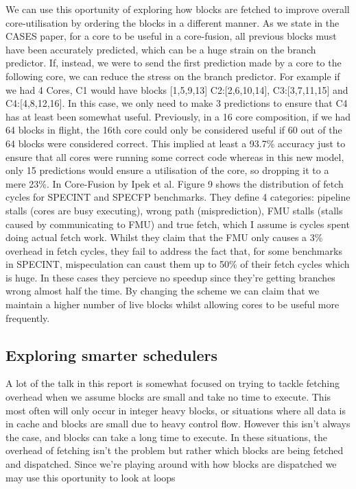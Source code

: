We can use this oportunity of exploring how blocks are fetched to improve overall core-utilisation by ordering the blocks in a different manner.
As we state in the CASES paper, for a core to be useful in a core-fusion, all previous blocks must have been accurately predicted, which can be a huge strain on the branch predictor.
If, instead, we were to send the first prediction made by a core to the following core, we can reduce the stress on the branch predictor.
For example if we had 4 Cores, C1 would have blocks [1,5,9,13] C2:[2,6,10,14], C3:[3,7,11,15] and C4:[4,8,12,16].
In this case, we only need to make 3 predictions to ensure that C4 has at least been somewhat useful.
Previously, in a 16 core composition, if we had 64 blocks in flight, the 16th core could only be considered useful if 60 out of the 64 blocks were considered correct.
This implied at least a 93.7\% accuracy just to ensure that all cores were running some correct code whereas in this new model, only 15 predictions would ensure a utilisation of the core, so dropping it to a mere 23\%.
In Core-Fusion by Ipek et al. Figure 9 shows the distribution of fetch cycles for SPECINT and SPECFP benchmarks.
They define 4 categories: pipeline stalls (cores are busy executing), wrong path (misprediction), FMU stalls (stalls caused by communicating to FMU) and true fetch, which I assume is cycles spent doing actual fetch work.
Whilst they claim that the FMU only causes a 3\% overhead in fetch cycles, they fail to address the fact that, for some benchmarks in SPECINT, mispeculation can caust them up to 50\% of their fetch cycles which is huge.
In these cases they percieve no speedup since they're getting branches wrong almost half the time.
By changing the scheme we can claim that we maintain a higher number of live blocks whilst allowing cores to be useful more frequently.

\subsection{Exploring smarter schedulers}

A lot of the talk in this report is somewhat focused on trying to tackle fetching overhead when we assume blocks are small and take no time to execute.
This most often will only occur in integer heavy blocks, or situations where all data is in cache and blocks are small due to heavy control flow.
However this isn't always the case, and blocks can take a long time to execute.
In these situations, the overhead of fetching isn't the problem but rather which blocks are being fetched and dispatched.
Since we're playing around with how blocks are dispatched we may use this oportunity to look at loops 

